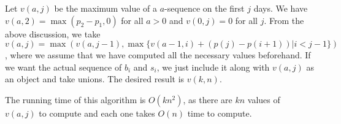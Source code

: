 \documentclass{article}
\begin{document}
Let $v(a,j)$ be the maximum value of a $a$-sequence on the first $j$ days. We have $v(a,2)=\max(p_2-p_1,0)$ for all $a>0$ and $v(0,j)=0$ for all $j$. From the above discussion, we take $v(a,j)=\max(v(a,j-1),\max\{v(a-1,i)+(p(j)-p(i+1))|i<j-1\})$, where we assume that we have computed all the necessary values beforehand. If we want the actual sequence of $b_i$ and $s_i$, we just include it along with $v(a,j)$ as an object and take unions. The desired result is $v(k,n)$.

The running time of this algorithm is $O(kn^2)$, as there are $kn$ values of $v(a,j)$ to compute and each one takes $O(n)$ time to compute.
\end{document}
